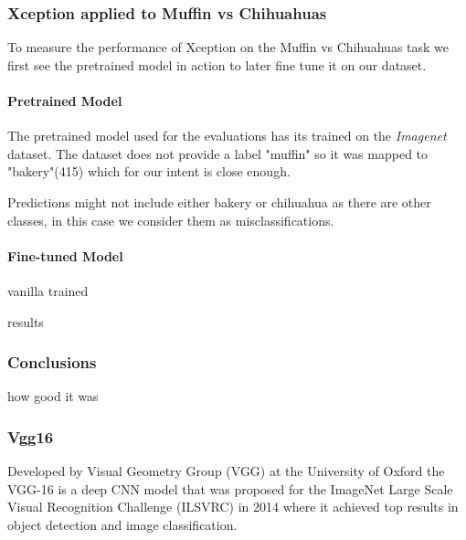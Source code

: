 \subsubsection{Xception applied to Muffin vs Chihuahuas}

To measure the performance of Xception on the Muffin vs Chihuahuas task we first see the pretrained model in action
to later fine tune it on our dataset.

\paragraph{Pretrained Model} The pretrained model used for the evaluations has its trained on the
\textit{Imagenet} dataset. The dataset does not provide a label "muffin" so it was mapped to "bakery"(415) which
for our intent is close enough.

Predictions might not include either bakery or chihuahua as there are other classes, in this case we consider them as misclassifications.


\paragraph{Fine-tuned Model}
vanilla
trained

results

\subsubsection{Conclusions}
how good it was

\subsubsection{Vgg16}
Developed by Visual Geometry Group (VGG) at the University of Oxford the VGG-16\cite{simonyan2015deep} is a deep CNN model that
was proposed for the ImageNet Large Scale Visual Recognition Challenge (ILSVRC) in 2014 where it achieved top results in object detection and image classification.

